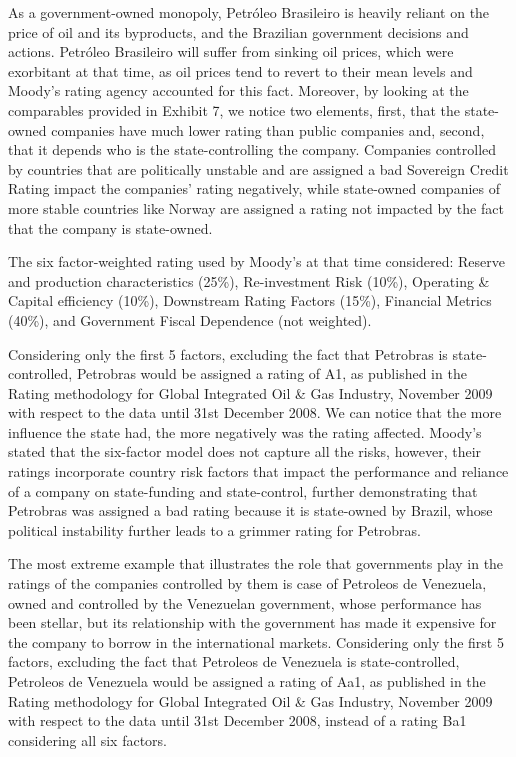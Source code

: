 \documentclass[
]{article}
\begin{document}
As a government-owned monopoly, Petróleo Brasileiro is heavily reliant
on the price of oil and its byproducts, and the Brazilian government
decisions and actions. Petróleo Brasileiro will suffer from sinking oil
prices, which were exorbitant at that time, as oil prices tend to revert
to their mean levels and Moody's rating agency accounted for this fact.
Moreover, by looking at the comparables provided in Exhibit 7, we notice
two elements, first, that the state-owned companies have much lower
rating than public companies and, second, that it depends who is the
state-controlling the company. Companies controlled by countries that
are politically unstable and are assigned a bad Sovereign Credit Rating
impact the companies' rating negatively, while state-owned companies of
more stable countries like Norway are assigned a rating not impacted by
the fact that the company is state-owned.

The six factor-weighted rating used by Moody's at that time considered:
Reserve and production characteristics (25\%), Re-investment Risk
(10\%), Operating \& Capital efficiency (10\%), Downstream Rating
Factors (15\%), Financial Metrics (40\%), and Government Fiscal
Dependence (not weighted).

Considering only the first 5 factors, excluding the fact that Petrobras
is state-controlled, Petrobras would be assigned a rating of A1, as
published in the Rating methodology for Global Integrated Oil \& Gas
Industry, November 2009 with respect to the data until 31st December
2008. We can notice that the more influence the state had, the more
negatively was the rating affected. Moody's stated that the six-factor
model does not capture all the risks, however, their ratings incorporate
country risk factors that impact the performance and reliance of a
company on state-funding and state-control, further demonstrating that
Petrobras was assigned a bad rating because it is state-owned by Brazil,
whose political instability further leads to a grimmer rating for
Petrobras.

The most extreme example that illustrates the role that governments play
in the ratings of the companies controlled by them is case of Petroleos
de Venezuela, owned and controlled by the Venezuelan government, whose
performance has been stellar, but its relationship with the government
has made it expensive for the company to borrow in the international
markets. Considering only the first 5 factors, excluding the fact that
Petroleos de Venezuela is state-controlled, Petroleos de Venezuela would
be assigned a rating of Aa1, as published in the Rating methodology for
Global Integrated Oil \& Gas Industry, November 2009 with respect to the
data until 31st December 2008, instead of a rating Ba1 considering all
six factors.
\end{document}
